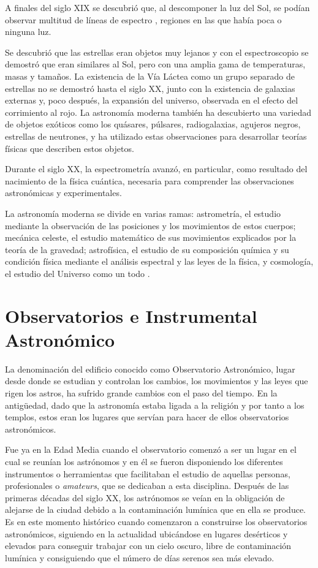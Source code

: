 A finales del siglo XIX se descubrió que, al descomponer la luz del Sol, se podían observar multitud de líneas de espectro , regiones en las que había poca o ninguna luz.

Se descubrió que las estrellas eran objetos muy lejanos y con el espectroscopio se demostró que eran similares al Sol, pero con una amplia gama de temperaturas, masas y tamaños. La existencia de la Vía Láctea como un grupo separado de estrellas no se demostró hasta el siglo XX, junto con la existencia de galaxias externas y, poco después, la expansión del universo, observada en el efecto del corrimiento al rojo. La astronomía moderna también ha descubierto una variedad de objetos exóticos como los quásares, púlsares, radiogalaxias, agujeros negros, estrellas de neutrones, y ha utilizado estas observaciones para desarrollar teorías físicas que describen estos objetos.

Durante el siglo XX, la espectrometría avanzó, en particular, como resultado del nacimiento de la física cuántica, necesaria para comprender las observaciones astronómicas y experimentales.

La astronomía moderna se divide en varias ramas: astrometría, el estudio mediante la observación de las posiciones y los movimientos de estos cuerpos; mecánica celeste, el estudio matemático de sus movimientos explicados por la teoría de la gravedad; astrofísica, el estudio de su composición química y su condición física mediante el análisis espectral y las leyes de la física, y cosmología, el estudio del Universo como un todo \cite{Astronomia2}.

\section{Observatorios e Instrumental Astronómico}
La denominación del edificio conocido como Observatorio Astronómico, lugar desde donde se estudian y controlan los cambios, los movimientos y las leyes que  rigen los astros, ha sufrido grande cambios con el paso del tiempo. En la antigüedad, dado que la astronomía estaba ligada a la religión y por tanto a los templos, estos eran los lugares que servían para hacer de ellos observatorios astronómicos.

Fue ya en la Edad Media cuando el observatorio comenzó a ser un lugar en el cual se reunían los astrónomos y en él se fueron disponiendo los diferentes instrumentos o herramientas que facilitaban el estudio de aquellas personas, profesionales o \textit{amateurs}, que se dedicaban a esta disciplina.
Después de las primeras décadas del siglo XX, los astrónomos se veían en la obligación de alejarse de la ciudad debido a la contaminación lumínica que en ella se produce. Es en este momento histórico cuando comenzaron a construirse los observatorios astronómicos, siguiendo en la actualidad ubicándose en lugares desérticos y elevados para conseguir trabajar con un cielo oscuro, libre de contaminación lumínica y consiguiendo que el número de días serenos sea más elevado.

